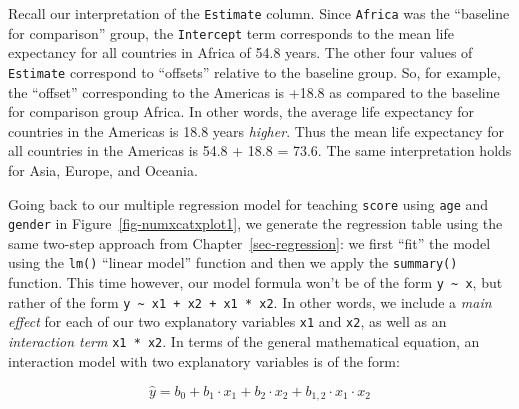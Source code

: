 \documentclass[
  letterpaper,
  DIV=11,
  numbers=noendperiod]{scrreprt}
\newenvironment{Shaded}{\begin{snugshade}}{\end{snugshade}}
\newcommand{\AttributeTok}[1]{\textcolor[rgb]{0.40,0.45,0.13}{#1}}
\newcommand{\CommentTok}[1]{\textcolor[rgb]{0.37,0.37,0.37}{#1}}
\newcommand{\FunctionTok}[1]{\textcolor[rgb]{0.28,0.35,0.67}{#1}}
\newcommand{\NormalTok}[1]{\textcolor[rgb]{0.00,0.23,0.31}{#1}}
\newcommand{\OtherTok}[1]{\textcolor[rgb]{0.00,0.23,0.31}{#1}}
\newcommand{\SpecialCharTok}[1]{\textcolor[rgb]{0.37,0.37,0.37}{#1}}
\theoremstyle{definition}
\theoremstyle{remark}
\begin{document}
Recall our interpretation of the \texttt{Estimate} column. Since
\texttt{Africa} was the ``baseline for comparison'' group, the
\texttt{Intercept} term corresponds to the mean life expectancy for all
countries in Africa of 54.8 years. The other four values of
\texttt{Estimate} correspond to ``offsets'' relative to the baseline
group. So, for example, the ``offset'' corresponding to the Americas is
+18.8 as compared to the baseline for comparison group Africa. In other
words, the average life expectancy for countries in the Americas is 18.8
years \emph{higher}. Thus the mean life expectancy for all countries in
the Americas is 54.8 + 18.8 = 73.6. The same interpretation holds for
Asia, Europe, and Oceania.

Going back to our multiple regression model for teaching \texttt{score}
using \texttt{age} and \texttt{gender} in
Figure~\ref{fig-numxcatxplot1}, we generate the regression table using
the same two-step approach from Chapter~\ref{sec-regression}: we first
``fit'' the model using the \texttt{lm()} ``linear model'' function and
then we apply the \texttt{summary()} function. This time however, our
model formula won't be of the form \texttt{y\ \textasciitilde{}\ x}, but
rather of the form
\texttt{y\ \textasciitilde{}\ x1\ +\ x2\ +\ x1\ *\ x2}. In other words,
we include a \emph{main effect} for each of our two explanatory
variables \texttt{x1} and \texttt{x2}, as well as an \emph{interaction
term} \texttt{x1\ *\ x2}. In terms of the general mathematical equation,
an interaction model with two explanatory variables is of the form:

\[\widehat{y} = b_0 + b_1 \cdot x_1 + b_2 \cdot x_2 + b_{1,2} \cdot x_1 \cdot x_2\]

\begin{Shaded}
\end{Shaded}
\end{document}
